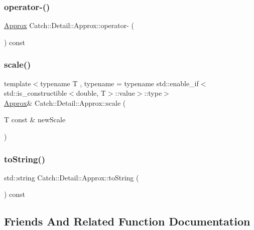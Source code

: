 \subsubsection{\texorpdfstring{operator-\/()}{operator-()}}
{\footnotesize\ttfamily \mbox{\hyperlink{class_catch_1_1_detail_1_1_approx}{Approx}} Catch\+::\+Detail\+::\+Approx\+::operator-\/ (\begin{DoxyParamCaption}{ }\end{DoxyParamCaption}) const}

\mbox{\label{class_catch_1_1_detail_1_1_approx_a8f4d2def2920a3840d3271f6d9c5ede2}} 
\subsubsection{\texorpdfstring{scale()}{scale()}}
{\footnotesize\ttfamily template$<$typename T , typename  = typename std\+::enable\+\_\+if$<$std\+::is\+\_\+constructible$<$double, T$>$\+::value$>$\+::type$>$ \\
\mbox{\hyperlink{class_catch_1_1_detail_1_1_approx}{Approx}}\& Catch\+::\+Detail\+::\+Approx\+::scale (\begin{DoxyParamCaption}\item[{T const \&}]{new\+Scale }\end{DoxyParamCaption})\hspace{0.3cm}{\ttfamily [inline]}}

\mbox{\label{class_catch_1_1_detail_1_1_approx_a972fd9ac60607483263f1b0f0f9955e6}} 
\subsubsection{\texorpdfstring{to\+String()}{toString()}}
{\footnotesize\ttfamily std\+::string Catch\+::\+Detail\+::\+Approx\+::to\+String (\begin{DoxyParamCaption}{ }\end{DoxyParamCaption}) const}



\subsection{Friends And Related Function Documentation}
\mbox{\label{class_catch_1_1_detail_1_1_approx_a29696f14ebd51887c8c88e771d12ef54}} 
